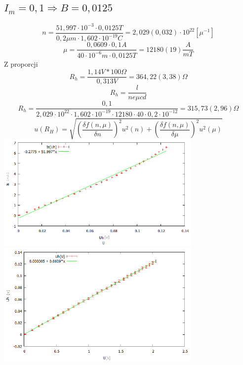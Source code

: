 \documentclass[10pt,a4paper]{article}
\begin{document}
\subsection{$I_m=0,1 \Rightarrow B=0,0125$}
\begin{equation}
n = \frac{51,997 \cdot 10^{-3} \cdot 0,0125T }{ 0,2\mu m \cdot 1,602 \cdot 10^{-19}C} = 2,029(0,032)\cdot10^{22} [\mu^{-1}]
\end{equation} 
\begin{equation}
\mu = \frac{0,0609\cdot0,1A }{40\cdot10^{-6}m \cdot 0,0125T} = 12180(19)\frac{A}{mT}
\end{equation} 
Z proporcji
\begin{equation}
R_h = \frac{1,14V * 100\Omega}{0,313V} = 364,22(3,38)\Omega
\end{equation} 
\begin{equation}
R_h = \frac{l}{ne\mu cd}
\end{equation} 
\begin{equation}
R_h = \frac{0,1}{2,029\cdot 10^{22} \cdot 1,602\cdot10^{-19} \cdot 12180 \cdot 40 \cdot 0,2 \cdot 10^{-12}} = 315,73(2,96) \Omega
\end{equation} 
\begin{equation}
	u(R_H) = \sqrt{\left(\frac{\delta f(n,\mu)}{\delta n}\right)^2 u^2(n) + \left(\frac{\delta f(n,\mu)}{\delta\mu}\right)^2 u^2(\mu)}
\end{equation}
\includegraphics[width=10cm]{21.png}
\includegraphics[width=10cm]{11.png}
\end{document}
